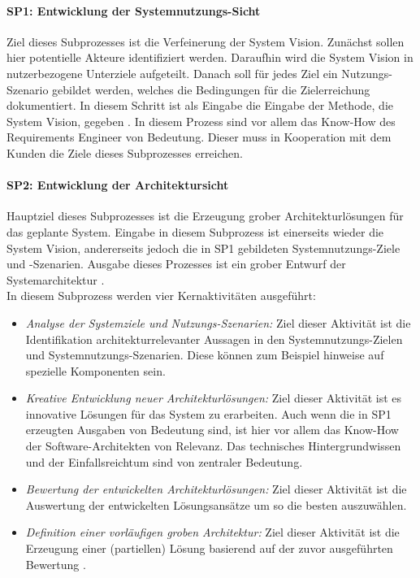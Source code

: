 \paragraph{SP1: Entwicklung der Systemnutzungs-Sicht}
Ziel dieses Subprozesses ist die Verfeinerung der System Vision. Zunächst sollen hier potentielle Akteure identifiziert werden. Daraufhin wird die System Vision in nutzerbezogene Unterziele aufgeteilt. Danach soll für jedes Ziel ein Nutzungs-Szenario gebildet werden, welches die Bedingungen für die Zielerreichung dokumentiert. In diesem Schritt ist als Eingabe die Eingabe der Methode, die System Vision, gegeben \cite{Poh01}. In diesem Prozess sind vor allem das Know-How des Requirements Engineer von Bedeutung. Dieser muss in Kooperation mit dem Kunden die Ziele dieses Subprozesses erreichen.\\

\paragraph{SP2: Entwicklung der Architektursicht}
Hauptziel dieses Subprozesses ist die Erzeugung grober Architekturlösungen für das geplante System. Eingabe in diesem Subprozess ist einerseits wieder die System Vision, andererseits jedoch die in SP1 gebildeten Systemnutzungs-Ziele und -Szenarien. Ausgabe dieses Prozesses ist ein grober Entwurf der Systemarchitektur \cite{Poh01}.\\

In diesem Subprozess werden vier Kernaktivitäten ausgeführt:\\

\begin{itemize}
\item \textit{Analyse der Systemziele und Nutzungs-Szenarien:} Ziel dieser Aktivität ist die Identifikation architekturrelevanter Aussagen in den Systemnutzungs-Zielen und Systemnutzungs-Szenarien. Diese können zum Beispiel hinweise auf spezielle Komponenten sein. 
\item \emph{Kreative Entwicklung neuer Architekturlösungen:} Ziel dieser Aktivität ist es innovative Lösungen für das System zu erarbeiten. Auch wenn die in SP1 erzeugten Ausgaben von Bedeutung sind, ist hier vor allem das Know-How der Software-Architekten von Relevanz. Das technisches Hintergrundwissen und der Einfallsreichtum sind von zentraler Bedeutung.
\item \emph{Bewertung der entwickelten Architekturlösungen:} Ziel dieser Aktivität ist die Auswertung der entwickelten Lösungsansätze um so die besten auszuwählen. 
\item \emph{Definition einer vorläufigen groben Architektur:} Ziel dieser Aktivität ist die Erzeugung einer (partiellen) Lösung basierend auf der zuvor ausgeführten Bewertung \cite{Poh01}.\\
\end{itemize} 

